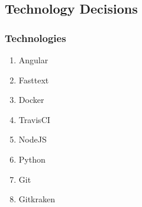 \documentclass[11pt]{article}
\begin{document}
\subsection{Technology Decisions}
\subsubsection{Technologies}
\begin{enumerate}
	\item Angular
	\item Fasttext
	\item Docker
	\item TravisCI
	\item NodeJS
	\item Python
	\item Git
	\item Gitkraken
\end{enumerate}
\end{document}
